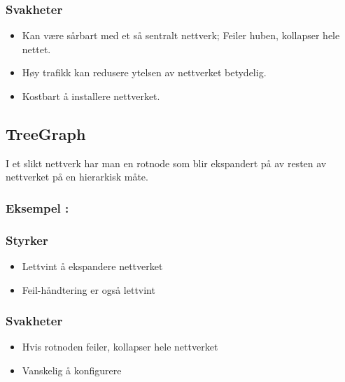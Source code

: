 \documentclass[11pt]{article}
\providecommand{\tightlist}{%
      \setlength{\itemsep}{0pt}\setlength{\parskip}{0pt}}
\begin{document}
\hypertarget{svakheter-2}{%
\subsubsection*{Svakheter}\label{svakheter-2}}

\begin{itemize}
\tightlist
\item
  Kan være sårbart med et så sentralt nettverk; Feiler huben, kollapser
  hele nettet.
\item
  Høy trafikk kan redusere ytelsen av nettverket betydelig.
\item
  Kostbart å installere nettverket.
\end{itemize}

\hypertarget{treegraph}{%
\subsection*{TreeGraph}\label{treegraph}}

I et slikt nettverk har man en rotnode som blir ekspandert på av resten
av nettverket på en hierarkisk måte.

\hypertarget{eksempel}{%
\subsubsection*{Eksempel :}\label{eksempel}}

\hypertarget{styrker-3}{%
\subsubsection*{Styrker}\label{styrker-3}}

\begin{itemize}
\tightlist
\item
  Lettvint å ekspandere nettverket
\item
  Feil-håndtering er også lettvint
\end{itemize}

\hypertarget{svakheter-3}{%
\subsubsection*{Svakheter}\label{svakheter-3}}

\begin{itemize}
\tightlist
\item
  Hvis rotnoden feiler, kollapser hele nettverket
\item
  Vanskelig å konfigurere
\end{itemize}
\end{document}

